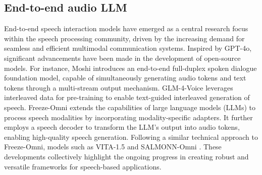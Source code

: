 \subsection{End-to-end audio LLM}
End-to-end speech interaction models have emerged as a central research focus within the speech processing community, driven by the increasing demand for seamless and efficient multimodal communication systems. Inspired by GPT-4o\cite{HelloGPT4o}, significant advancements have been made in the development of open-source models. For instance, Moshi \cite{defossez2024moshi} introduces an end-to-end full-duplex spoken dialogue foundation model, capable of simultaneously generating audio tokens and text tokens through a multi-stream output mechanism. GLM-4-Voice \cite{zeng2024glm} leverages interleaved data for pre-training to enable text-guided interleaved generation of speech. Freeze-Omni \cite{wang2024freeze} extends the capabilities of large language models (LLMs) to process speech modalities by incorporating modality-specific adapters. It further employs a speech decoder to transform the LLM's output into audio tokens, enabling high-quality speech generation. Following a similar technical approach to Freeze-Omni, models such as VITA-1.5 \cite{fu2025vita} and SALMONN-Omni \cite{yu2024salmonn}. These developments collectively highlight the ongoing progress in creating robust and versatile frameworks for speech-based applications.


